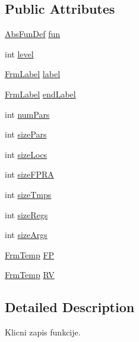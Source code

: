 \subsection*{Public Attributes}
\begin{DoxyCompactItemize}
\item 
\hyperlink{classcompiler_1_1abstr_1_1tree_1_1def_1_1_abs_fun_def}{Abs\+Fun\+Def} \hyperlink{classcompiler_1_1frames_1_1_frm_frame_a800e5923693318d36b54a28dd64d7cf7}{fun}
\item 
int \hyperlink{classcompiler_1_1frames_1_1_frm_frame_a5cf4f72e35b816f6f162a8495e288d00}{level}
\item 
\hyperlink{classcompiler_1_1frames_1_1_frm_label}{Frm\+Label} \hyperlink{classcompiler_1_1frames_1_1_frm_frame_a57d0b0f36dea34417e70b5a216aaf928}{label}
\item 
\hyperlink{classcompiler_1_1frames_1_1_frm_label}{Frm\+Label} \hyperlink{classcompiler_1_1frames_1_1_frm_frame_a4c2ed594a78051e796cda09104f6020d}{end\+Label}
\item 
int \hyperlink{classcompiler_1_1frames_1_1_frm_frame_aac77ef20eb7883b9a78753e33e3239b4}{num\+Pars}
\item 
int \hyperlink{classcompiler_1_1frames_1_1_frm_frame_ac8fc720eb67c5712d900aa23c983a7d8}{size\+Pars}
\item 
int \hyperlink{classcompiler_1_1frames_1_1_frm_frame_aede08fd787d9907119b49b83b34eca73}{size\+Locs}
\item 
int \hyperlink{classcompiler_1_1frames_1_1_frm_frame_a1c42b58cacb7d9167c38c49c8f9f695c}{size\+F\+P\+RA}
\item 
int \hyperlink{classcompiler_1_1frames_1_1_frm_frame_ad3b018e20a2d43455419f7b00f30193a}{size\+Tmps}
\item 
int \hyperlink{classcompiler_1_1frames_1_1_frm_frame_a0151ad9adaddb45156c732d1e0a26bdd}{size\+Regs}
\item 
int \hyperlink{classcompiler_1_1frames_1_1_frm_frame_a71e357ce0274fb5bb509ce86f259f2fd}{size\+Args}
\item 
\hyperlink{classcompiler_1_1frames_1_1_frm_temp}{Frm\+Temp} \hyperlink{classcompiler_1_1frames_1_1_frm_frame_abd7ebde9f8bff982344b3fa0bc2a9c8b}{FP}
\item 
\hyperlink{classcompiler_1_1frames_1_1_frm_temp}{Frm\+Temp} \hyperlink{classcompiler_1_1frames_1_1_frm_frame_a48bb338c65830485b46a30a24c0af650}{RV}
\end{DoxyCompactItemize}


\subsection{Detailed Description}
Klicni zapis funkcije.

